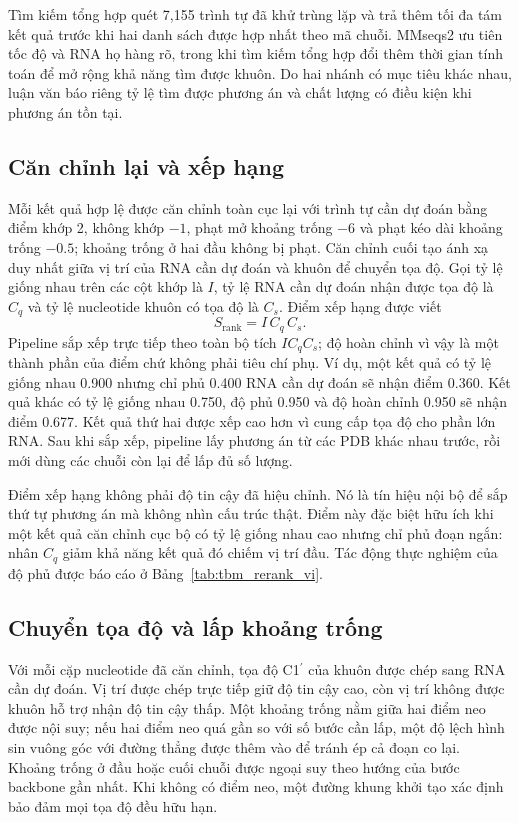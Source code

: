 \documentclass[12pt,a4paper,oneside]{report}
\newcommand{\cprime}{C1$^{\prime}$}
\begin{document}
Tìm kiếm tổng hợp quét 7,155 trình tự đã khử trùng lặp và trả thêm tối đa tám kết quả
trước khi hai danh sách được hợp nhất theo mã chuỗi. MMseqs2 ưu tiên tốc độ và RNA họ
hàng rõ, trong khi tìm kiếm tổng hợp đổi thêm thời gian tính toán để mở rộng khả năng tìm được khuôn. Do
hai nhánh có mục tiêu khác nhau, luận văn báo riêng tỷ lệ tìm được phương án và chất lượng
có điều kiện khi phương án tồn tại.

\subsection{Căn chỉnh lại và xếp hạng}

Mỗi kết quả hợp lệ được căn chỉnh toàn cục lại với trình tự cần dự đoán bằng điểm khớp 2,
không khớp $-1$, phạt mở khoảng trống $-6$ và phạt kéo dài khoảng trống $-0.5$; khoảng
trống ở hai đầu không bị phạt. Căn chỉnh cuối tạo ánh xạ duy nhất giữa vị trí của RNA cần
dự đoán và khuôn để chuyển tọa độ. Gọi tỷ lệ giống nhau trên các cột khớp là $I$, tỷ lệ
RNA cần dự đoán nhận được tọa độ là $C_q$ và tỷ lệ nucleotide khuôn có
tọa độ là $C_s$. Điểm xếp hạng được viết
\begin{equation}
S_{\mathrm{rank}} = I\,C_q\,C_s.
\label{eq:rank_vi}
\end{equation}
Pipeline sắp xếp trực tiếp theo toàn bộ tích $I C_q C_s$; độ hoàn chỉnh vì vậy là một
thành phần của điểm chứ không phải tiêu chí phụ. Ví dụ, một kết quả có tỷ lệ giống nhau
0.900 nhưng chỉ phủ 0.400 RNA cần dự đoán sẽ nhận điểm 0.360. Kết quả khác có tỷ lệ giống
nhau 0.750, độ phủ 0.950 và độ hoàn chỉnh 0.950 sẽ nhận điểm 0.677. Kết quả thứ hai được xếp cao hơn vì cung cấp tọa độ cho
phần lớn RNA. Sau khi sắp xếp, pipeline lấy phương án từ các PDB khác nhau trước, rồi mới
dùng các chuỗi còn lại để lấp đủ số lượng.

Điểm xếp hạng không phải độ tin cậy đã hiệu chỉnh. Nó là tín hiệu nội bộ để sắp thứ tự
phương án mà không nhìn cấu trúc thật. Điểm này đặc biệt hữu ích khi một kết quả căn chỉnh
cục bộ có tỷ lệ giống nhau cao nhưng chỉ phủ đoạn ngắn: nhân $C_q$ giảm khả năng kết quả
đó chiếm vị trí đầu. Tác động thực nghiệm của độ phủ được báo cáo ở Bảng~\ref{tab:tbm_rerank_vi}.

\subsection{Chuyển tọa độ và lấp khoảng trống}

Với mỗi cặp nucleotide đã căn chỉnh, tọa độ \cprime{} của khuôn được chép sang RNA cần
dự đoán. Vị trí được chép trực tiếp giữ độ tin cậy cao, còn vị trí không được khuôn hỗ trợ
nhận độ tin cậy thấp. Một khoảng trống nằm giữa hai điểm neo được nội suy; nếu hai điểm neo quá gần so với
số bước cần lấp, một độ lệch hình sin vuông góc với đường thẳng được thêm vào để tránh
ép cả đoạn co lại. Khoảng trống ở đầu hoặc cuối chuỗi được ngoại suy theo hướng của bước
backbone gần nhất. Khi không có điểm neo, một đường khung khởi tạo xác định bảo đảm mọi tọa độ đều hữu hạn.
\end{document}
